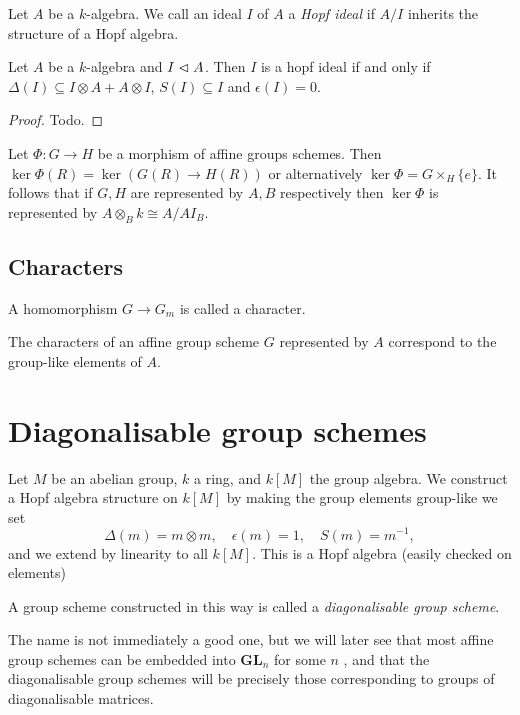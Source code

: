 \documentclass{memoir}
\begin{document}
\begin{definition}
    Let $A$ be a $k$-algebra. 
    We call an ideal $I$ of $A$ a \textit{Hopf ideal} if $A/I$ inherits the structure of a Hopf algebra.
\end{definition}
\begin{proposition}
    Let $A$ be a $k$-algebra and $I\vartriangleleft A$. Then $I$ is a hopf ideal if and only if $\Delta(I)\subseteq I\otimes A + A\otimes I$, $S(I)\subseteq I$ and $\epsilon(I) = 0$.
\end{proposition}
\begin{proof}
    Todo.
\end{proof}
\begin{definition}
    Let $\Phi:G\to H$ be a morphism of affine groups schemes. 
    Then $\ker\Phi (R) = \ker(G(R)\to H(R))$ or alternatively $\ker\Phi = G\times_H\{e\}$.
    It follows that if $G,H$ are represented by $A,B$ respectively then $\ker\Phi$ is represented by $A\otimes_B k\cong A/AI_B$.
\end{definition}
\subsection{Characters}
\begin{definition}
    A homomorphism $G\to G_m$ is called a character.
\end{definition}
\begin{theorem}\label{thm:characters_are_gp-like_elems}
    The characters of an affine group scheme $G$ represented by $A$ correspond to the group-like elements of $A$.
\end{theorem}
\section{Diagonalisable group schemes}\label{sec:diag_gp_sch}

Let $ M $ be an abelian group, $ k $ a ring, and $ k[M] $ the group algebra. We construct a Hopf algebra structure on $ k[M] $ by making the group elements group-like \ie we set \[ \Delta(m)=m\otimes m,\quad \epsilon(m)=1,\quad S(m)=m^{-1}, \] and we extend by linearity to all $ k[M] $. This is a Hopf algebra (easily checked on elements)
\begin{definition}\label{def:diag_gp_sch}
	A group scheme constructed in this way is called a \emph{diagonalisable group scheme}.
\end{definition}
The name is not immediately a good one, but we will later see that most affine group schemes can be embedded into $ \mathbf{GL}_n $ for some $ n $ , and that the diagonalisable group schemes will be precisely those corresponding to groups of diagonalisable matrices. 
\end{document}

